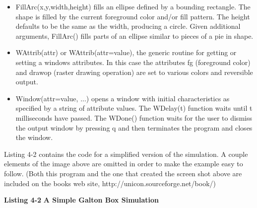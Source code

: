 \begin{itemize}
\item \textsf{FillArc(x,y,width,height)} fills an ellipse defined by a
bounding rectangle. The shape is filled by the current foreground color
and/or fill pattern. The height defaults to be the same as the width,
producing a circle. Given additional arguments, \textsf{FillArc()
}fills parts of an ellipse similar to pieces of a pie in shape.
\item \textsf{WAttrib({\textquotedbl}attr{\textquotedbl})} or
\textsf{WAttrib({\textquotedbl}attr=value{\textquotedbl})}, the generic
routine for getting or setting a window{\textquotesingle}s attributes.
In this case the attributes \textsf{fg} (foreground color) and
\textsf{drawop} (raster drawing operation) are set to various colors
and reversible output.
\item \textsf{Window({\textquotedbl}attr=value{\textquotedbl}, ...)}
opens a window with initial characteristics as specified by a string of
attribute values. The \textsf{WDelay(t)} function waits until
\textsf{t} milliseconds have passed. The \textsf{WDone()} function
waits for the user to dismiss the output window by pressing
\textsf{{\textquotedbl}q{\textquotedbl}} and then terminates the
program and closes the window.
\end{itemize}
Listing 4-2 contains the code for a simplified version of the
simulation. A couple elements of the image above are omitted in order
to make the example easy to follow. (Both this program and the one that
created the screen shot above are included on the
book{\textquotesingle}s web site, http://unicon.sourceforge.net/book/)

{\sffamily\bfseries Listing 4-2}
{\sffamily\bfseries A Simple Galton Box Simulation}

